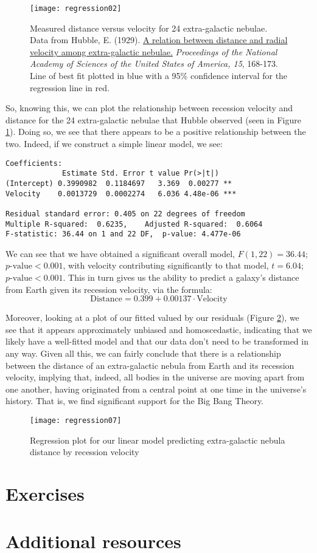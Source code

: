 \begin{figure}[htp]
\texttt{[image: regression02]}
\caption{Measured distance versus velocity for 24 extra-galactic nebulae. Data from Hubble, E. (1929). \href{http://www.ncbi.nlm.nih.gov/pmc/articles/PMC522427/}{A relation between distance and radial velocity among extra-galactic nebulae.} \textit{Proceedings of the National Academy of Sciences of the United States of America, 15}, 168-173. Line of best fit plotted in blue with a 95\% confidence interval for the regression line in red.}
\label{fig:regression02}
\end{figure}

So, knowing this, we can plot the relationship between recession velocity and distance for the 24 extra-galactic nebulae that Hubble observed (seen in Figure \ref{fig:regression02}). Doing so, we see that there appears to be a positive relationship between the two. Indeed, if we construct a simple linear model, we see:

\begin{framed}
\begin{Verbatim}[samepage=TRUE]
Coefficients:
             Estimate Std. Error t value Pr(>|t|)    
(Intercept) 0.3990982  0.1184697   3.369  0.00277 ** 
Velocity    0.0013729  0.0002274   6.036 4.48e-06 ***

Residual standard error: 0.405 on 22 degrees of freedom
Multiple R-squared:  0.6235,	Adjusted R-squared:  0.6064 
F-statistic: 36.44 on 1 and 22 DF,  p-value: 4.477e-06
\end{Verbatim}
\end{framed}

We can see that we have obtained a significant overall model, $F(1,22) = 36.44$; $p\text{-value}<0.001$, with velocity contributing significantly to that model, $t=6.04$; $p\text{-value}<0.001$. This in turn gives us the ability to predict a galaxy's distance from Earth given its recession velocity, via the formula:
\begin{equation*}
\text{Distance}=0.399+0.00137\cdot\text{Velocity}
\end{equation*}

Moreover, looking at a plot of our fitted valued by our residuals (Figure \ref{fig:regression07}), we see that it appears approximately unbiased and homoscedastic, indicating that we likely have a well-fitted model and that our data don't need to be transformed in any way. Given all this, we can fairly conclude that there is a relationship between the distance of an extra-galactic nebula from Earth and its recession velocity, implying that, indeed, all bodies in the universe are moving apart from one another, having originated from a central point at one time in the universe's history. That is, we find significant support for the Big Bang Theory.

\begin{figure}[htp]
\texttt{[image: regression07]}
\caption{Regression plot for our linear model predicting extra-galactic nebula distance by recession velocity}
\label{fig:regression07}
\end{figure}
\section{Exercises}

\section{Additional resources}